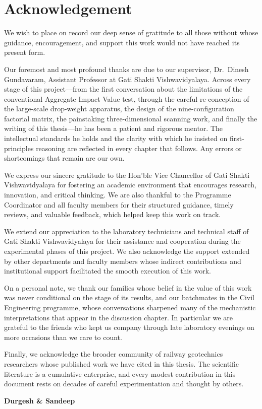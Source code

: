 \chapter*{Acknowledgement}
\thispagestyle{plain}

We wish to place on record our deep sense of gratitude to all those without
whose guidance, encouragement, and support this work would not have reached
its present form.

Our foremost and most profound thanks are due to our supervisor,
Dr.\ Dinesh Gundavaram, Assistant Professor at Gati Shakti Vishwavidyalaya.
Across every stage of this project---from the first conversation about the
limitations of the conventional Aggregate Impact Value test, through the
careful re-conception of the large-scale drop-weight apparatus, the design of
the nine-configuration factorial matrix, the painstaking three-dimensional
scanning work, and finally the writing of this thesis---he has been a
patient and rigorous mentor. The intellectual standards he holds and the
clarity with which he insisted on first-principles reasoning are reflected in
every chapter that follows. Any errors or shortcomings that remain are our
own.

We express our sincere gratitude to the Hon'ble Vice Chancellor of Gati
Shakti Vishwavidyalaya for fostering an academic environment that encourages
research, innovation, and critical thinking. We are also thankful to the
Programme Coordinator and all faculty members for their structured guidance,
timely reviews, and valuable feedback, which helped keep this work on track.

We extend our appreciation to the laboratory technicians and technical staff
of Gati Shakti Vishwavidyalaya for their assistance and cooperation during
the experimental phases of this project. We also acknowledge the support
extended by other departments and faculty members whose indirect
contributions and institutional support facilitated the smooth execution of
this work.

On a personal note, we thank our families whose belief in the value of this
work was never conditional on the stage of its results, and our batchmates
in the Civil Engineering programme, whose conversations sharpened many of
the mechanistic interpretations that appear in the discussion chapter. In
particular we are grateful to the friends who kept us company through late
laboratory evenings on more occasions than we care to count.

Finally, we acknowledge the broader community of railway geotechnics
researchers whose published work we have cited in this thesis. The scientific
literature is a cumulative enterprise, and every modest contribution in this
document rests on decades of careful experimentation and thought by others.

\vspace{1.2cm}
\hfill\textbf{Durgesh \& Sandeep}\hspace{2cm}\mbox{}
